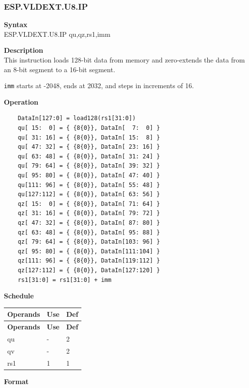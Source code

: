 \newpage
\subsubsection{ESP.VLDEXT.U8.IP}\label{instruction:ESPVLDEXTU8IP}
\textbf{Syntax}\\
ESP.VLDEXT.U8.IP qu,qz,rs1,imm

\textbf{Description}\\
This instruction loads 128-bit data from memory and zero-extends the data from an 8-bit segment to a 16-bit segment.

\lstinline{imm} starts at -2048, ends at 2032, and steps in increments of 16.

\textbf{Operation}\\
\begin{lstlisting}
    DataIn[127:0] = load128(rs1[31:0])
    qu[ 15:  0] = { {8{0}}, DataIn[  7:  0] }
    qu[ 31: 16] = { {8{0}}, DataIn[ 15:  8] }
    qu[ 47: 32] = { {8{0}}, DataIn[ 23: 16] }
    qu[ 63: 48] = { {8{0}}, DataIn[ 31: 24] }
    qu[ 79: 64] = { {8{0}}, DataIn[ 39: 32] }
    qu[ 95: 80] = { {8{0}}, DataIn[ 47: 40] }
    qu[111: 96] = { {8{0}}, DataIn[ 55: 48] }
    qu[127:112] = { {8{0}}, DataIn[ 63: 56] }
    qz[ 15:  0] = { {8{0}}, DataIn[ 71: 64] }
    qz[ 31: 16] = { {8{0}}, DataIn[ 79: 72] }
    qz[ 47: 32] = { {8{0}}, DataIn[ 87: 80] }
    qz[ 63: 48] = { {8{0}}, DataIn[ 95: 88] }
    qz[ 79: 64] = { {8{0}}, DataIn[103: 96] }
    qz[ 95: 80] = { {8{0}}, DataIn[111:104] }
    qz[111: 96] = { {8{0}}, DataIn[119:112] }
    qz[127:112] = { {8{0}}, DataIn[127:120] }
    rs1[31:0] = rs1[31:0] + imm
\end{lstlisting}

\textbf{Schedule}\\
\begin{longtable}[c]{|l|l|l|}
    \hline
    \rowcolor{lightgray}
    \textbf{Operands} & \textbf{Use} & \textbf{Def} \\\hline
    \endfirsthead
    \hline
    \rowcolor{lightgray}
     \textbf{Operands} & \textbf{Use} & \textbf{Def} \\\hline
    \endhead
    \hline
    \endfoot

  qu & - & 2 \\\hline
  qv & - & 2 \\\hline
  rs1 & 1 & 1

\end{longtable}

\textbf{Format}\\

